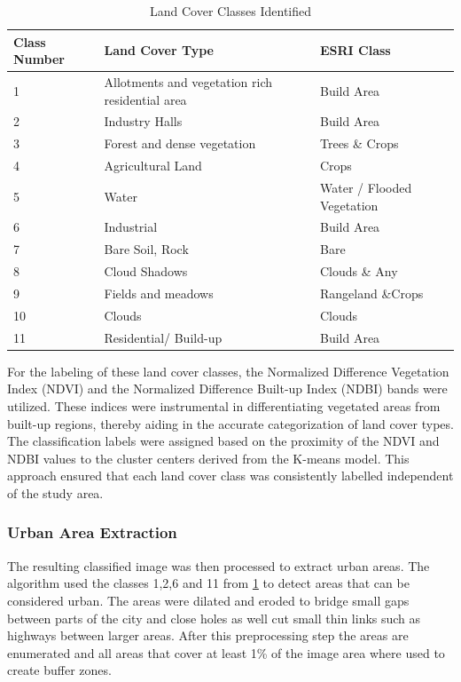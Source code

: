 \documentclass[12pt,a4paper, english,twoside]{article}
\begin{document}
    \begin{table}[ht]
    \centering
    \renewcommand{\arraystretch}{1.4}
    \caption{Land Cover Classes Identified\label{tab:land_cover_classes}}
    \begin{tabular}{p{0.5cm}p{4cm}l}
    \toprule
    \textbf{Class Number} & \textbf{Land Cover Type} & \textbf{ESRI Class}\\
    \midrule
    1 &  Allotments and vegetation rich residential area  & Build Area\\
    2 &  Industry Halls & Build Area\\
    3 &  Forest and dense vegetation& Trees \& Crops\\
    4 &  Agricultural Land & Crops\\
    5 &  Water& Water / Flooded Vegetation\\
    6 &  Industrial& Build Area\\
    7 &  Bare Soil, Rock & Bare \\
    8 &  Cloud Shadows & Clouds \& Any \\
    9 &  Fields and meadows& Rangeland \&Crops \\
    10 &  Clouds & Clouds \\
    11 &  Residential/ Build-up& Build Area\\
    \bottomrule
    \end{tabular}
    \end{table}
    For the labeling of these land cover classes, the Normalized Difference Vegetation Index (NDVI) and the Normalized Difference Built-up Index (NDBI) bands were utilized.
    These indices were instrumental in differentiating vegetated areas from built-up regions, thereby aiding in the accurate categorization of land cover types.
    The classification labels were assigned based on the proximity of the NDVI and NDBI values to the cluster centers derived from the K-means model.
    This approach ensured that each land cover class was consistently labelled independent of the study area.\\
    \subsubsection{Urban Area Extraction}
    The resulting classified image was then processed to extract urban areas.
    The algorithm used the classes 1,2,6 and 11 from \cref{tab:land_cover_classes} to detect areas that can be considered urban.
    The areas were \gls{dilated} and \gls{eroded} to bridge small gaps between parts of the city and close holes as well cut small thin links such as highways between larger areas.
    After this preprocessing step the areas are enumerated and all areas that cover at least 1\% of the image area where used to create buffer zones. 
\end{document}
